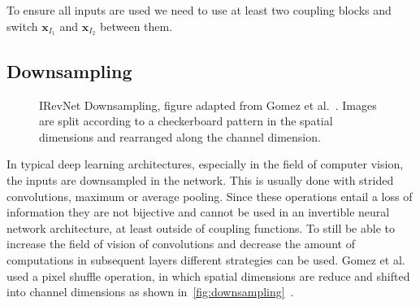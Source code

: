 To ensure all inputs are used we need to use at least two coupling blocks and
switch $\mathbf{x}_{I_1}$ and $\mathbf{x}_{I_2}$ between them.

\subsection{Downsampling}%
\label{sub:downsampling}

\begin{figure}[htpb]
\begin{center}
\end{center}
\caption{IRevNet Downsampling, figure adapted from Gomez et
al.~\citep{gomezReversibleResidualNetwork2017}. Images are split according to a
checkerboard pattern in the spatial dimensions and rearranged along the channel
dimension.}%
\label{fig:downsampling}
\end{figure}

In typical deep learning architectures, especially in the field of computer
vision, the inputs are downsampled in the network. This is usually done with
strided convolutions, maximum or average pooling. Since these operations entail
a loss of information they are not bijective and cannot be used in an
invertible neural network architecture, at least outside of coupling functions.
To still be able to increase the field of vision of convolutions and decrease the
amount of computations in subsequent layers different strategies can be used. Gomez
et al. used a pixel shuffle operation, in which spatial dimensions are reduce and
shifted into channel dimensions as shown
in~\autoref{fig:downsampling}~\citep{gomezReversibleResidualNetwork2017}. 

